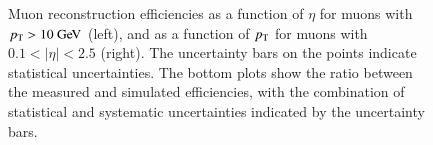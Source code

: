\begin{figure}[htbp]
	\centering
	\hfill
	\caption{Muon reconstruction efficiencies as a function of $\eta$ for muons with $\pt>10 \GeV$ (left), and as a function of $p_{\text{T}}$ for muons with $0.1<|\eta|<2.5$ (right). The uncertainty bars on the points indicate statistical uncertainties. The bottom plots show the ratio between the measured and simulated efficiencies, with the combination of statistical and systematic uncertainties indicated by the uncertainty bars.}
	\label{fig:reco-muon-efficiency}
\end{figure}


